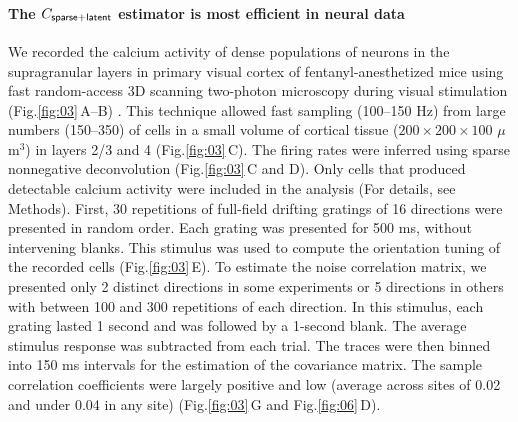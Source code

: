 \documentclass[10pt]{article}
\newcommand{\figref}[2]{Fig.\;\ref{fig:#1}\,#2}
\begin{document}
\paragraph{The $C_{\sf sparse+latent}$ estimator is most efficient in neural data}
We recorded the calcium activity of dense populations of neurons in the supragranular layers in primary visual cortex of fentanyl-anesthetized mice using fast random-access 3D scanning two-photon microscopy during visual stimulation (\figref{03}{A--B}) \cite{Reddy:2005, Katona:2012, Cotton:2013}. This technique allowed fast sampling (100--150 Hz) from large numbers (150--350) of cells in a small volume of cortical tissue ($200\times200\times100$ $\mu$m$^3$) in layers 2/3 and 4 (\figref{03}{C}).  The firing rates were inferred using sparse nonnegative deconvolution \cite{Vogelstein:2010} (\figref{03}{C and D}). Only cells that produced detectable calcium activity were included in the analysis (For details, see Methods).  First, 30 repetitions of full-field drifting gratings of 16 directions were presented in random order.  Each grating was presented for 500 ms, without intervening blanks.  This stimulus was used to compute the orientation tuning of the recorded cells (\figref{03}{E}). To estimate the noise correlation matrix, we presented only 2 distinct directions in some experiments or 5 directions in others with between 100 and 300 repetitions of each direction. In this stimulus, each grating lasted 1 second and was followed by a 1-second blank.  The average stimulus response was subtracted from each trial. The traces were then binned into 150 ms intervals for the estimation of the covariance matrix.   The sample correlation coefficients were largely positive and low (average across sites of 0.02 and under 0.04 in any site) (\figref{03}{G} and \figref{06}{D}).  
\end{document}
